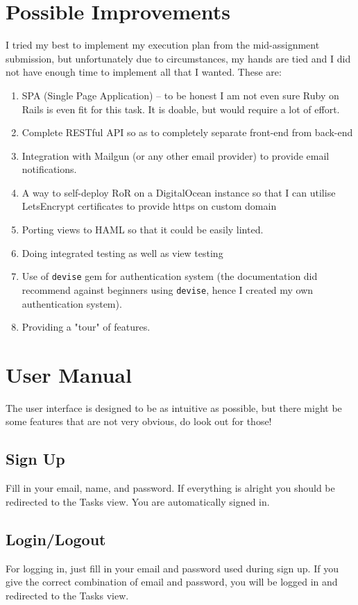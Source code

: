 \documentclass[12pt, a4paper]{article}
\begin{document}
	\section{Possible Improvements}
		I tried my best to implement my execution plan from the mid-assignment submission, but unfortunately due to circumstances, my hands are tied and I did not have enough time to implement all that I wanted. These are:
		\begin{enumerate}
			\item SPA (Single Page Application) -- to be honest I am not even sure Ruby on Rails is even fit for this task. It is doable, but would require a lot of effort.
			\item Complete RESTful API so as to completely separate front-end from back-end
			\item Integration with Mailgun (or any other email provider) to provide email notifications.
			\item A way to self-deploy RoR on a DigitalOcean instance so that I can utilise LetsEncrypt certificates to provide https on custom domain
			\item Porting views to HAML so that it could be easily linted.
			\item Doing integrated testing as well as view testing
			\item Use of \texttt{devise} gem for authentication system (the documentation did recommend against beginners using \texttt{devise}, hence I created my own authentication system).
			\item Providing a "tour" of features.
		\end{enumerate}
	\section{User Manual}
		The user interface is designed to be as intuitive as possible, but there might be some features that are not very obvious, do look out for those!
		
		\subsection{Sign Up}
		Fill in your email, name, and password. If everything is alright you should be redirected to the Tasks view. You are automatically signed in.
		
		\subsection{Login/Logout}
		For logging in, just fill in your email and password used during sign up. If you give the correct combination of email and password, you will be logged in and redirected to the Tasks view.
		
\end{document}
